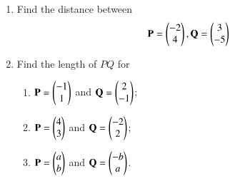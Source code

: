 
\renewcommand{\theequation}{\theenumi}
\begin{enumerate}[label=\arabic*.,ref=\thesubsection.\theenumi]


\item Find the distance between 
\begin{align}
\mathbf{P} = \begin{pmatrix}-2\\4\end{pmatrix}, \mathbf{Q} = \begin{pmatrix}3\\-5\end{pmatrix}
\end{align}
\solution

%
\item
Find the length of $PQ$ for
\begin{enumerate}
\item $\mathbf{P}=\begin{pmatrix}-1\\1\end{pmatrix}$ and $\mathbf{Q}=\begin{pmatrix}2\\-1\end{pmatrix}$;
\item $\mathbf{P}=\begin{pmatrix}4\\3\end{pmatrix}$ and $\mathbf{Q}=\begin{pmatrix}-2\\2\end{pmatrix}$;
\item $\mathbf{P}=\begin{pmatrix}a\\b\end{pmatrix}$ and $\mathbf{Q}=\begin{pmatrix}-b\\a\end{pmatrix}$.
\end{enumerate}


\end{enumerate}
